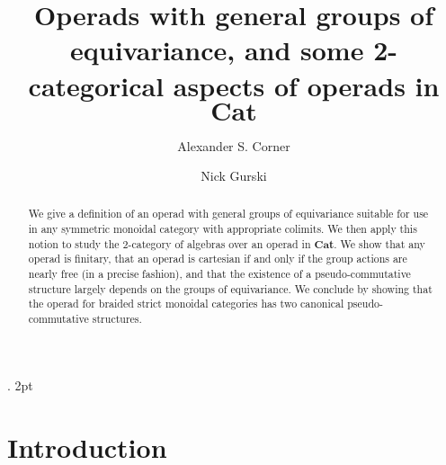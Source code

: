 \documentclass{amsart} %
\newcommand{\mb}{\mathbf}
\begin{document}
\newtheorem{thm}{Theorem}[section]
\newtheorem{prop}[thm]{Proposition}
\newtheorem{lem}[thm]{Lemma}
\newtheorem{cor}[thm]{Corollary}

%
     {}%
     {}%
     {\bfseries}%
     {.}%
     {2pt}%
     {}%
		
		

   \theoremstyle{example}
	\newtheorem{conv}[thm]{Conventions}
   \newtheorem{nota}[thm]{Notation}
   \newtheorem{example}[thm]{Example}
	\newtheorem{Defi}[thm]{Definition}
   \newtheorem{rem}[thm]{Remark}

   \title[Operads]{Operads with general groups of equivariance, and some 2-categorical aspects of operads in $\mb{Cat}$}

\author{Alexander S. Corner}
\address{
School of Mathematics and Statistics,
University of Sheffield,
Sheffield, UK, S3 7RH
}
\author{Nick Gurski}
\address{
School of Mathematics and Statistics,
University of Sheffield,
Sheffield, UK, S3 7RH
}

\begin{abstract}
We give a definition of an operad with general groups of equivariance suitable for use in any symmetric monoidal category with appropriate colimits.  We then apply this notion to study the 2-category of algebras over an operad in $\mb{Cat}$.  We show that any operad is finitary, that an operad is cartesian if and only if the group actions are nearly free (in a precise fashion), and that the existence of a pseudo-commutative structure largely depends on the groups of equivariance.  We conclude by showing that the operad for braided strict monoidal categories has two canonical pseudo-commutative structures.
\end{abstract}

\maketitle

\tableofcontents
	
\section*{Introduction}














\end{document}
